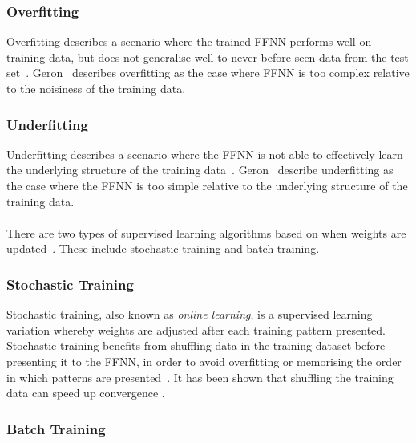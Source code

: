 \subsubsection{Overfitting}\label{sec:anns:training:process:overfitting}

Overfitting describes a scenario where the trained \acs{FFNN} performs well on training data, but does not generalise well to never before seen data from the test set~\cite{ref:tetko:1995, ref:geron:2017}. Geron~\cite{ref:geron:2017} describes overfitting as the case where \acs{FFNN} is too complex relative to the noisiness of the training data.

\subsubsection{Underfitting}\label{sec:anns:training:process:underfitting}

Underfitting describes a scenario where the \acs{FFNN} is not able to effectively learn the underlying structure of the training data~\cite{ref:tetko:1995, ref:geron:2017}. Geron~\cite{ref:geron:2017} describe underfitting as the case where the \acs{FFNN} is too simple relative to the underlying structure of the training data.\\
\\
There are two types of supervised learning algorithms based on when weights are updated~\cite{ref:engelbrecht:2007}. These include stochastic training and batch
training.


\subsubsection{Stochastic Training}\label{sec:anns:training:stochastic}

Stochastic training, also known as \textit{online learning}, is a supervised learning variation whereby weights are adjusted after each training pattern presented. Stochastic training benefits from shuffling data in the training dataset before presenting it to the \acs{FFNN}, in order to avoid overfitting or memorising the order in which patterns are presented~\cite{ref:engelbrecht:2007}. It has been shown that shuffling the training data can speed up convergence
\cite{ref:bengio:2012}.


\subsubsection{Batch Training}\label{sec:anns:training:batch}

